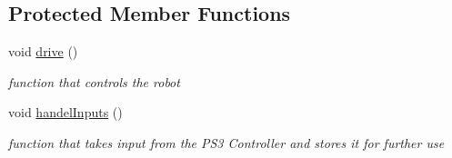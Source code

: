 \subsection*{Protected Member Functions}
\begin{DoxyCompactItemize}
\item 
\mbox{\label{class_new_omni_drive_a181b752b0907c43da6b6bccb5b6b1106}} 
void \mbox{\hyperlink{class_new_omni_drive_a181b752b0907c43da6b6bccb5b6b1106}{drive}} ()
\begin{DoxyCompactList}\small\item\em function that controls the robot \end{DoxyCompactList}\item 
\mbox{\label{class_new_omni_drive_ab3fd088274c17cb1fc7b2739e31a80a0}} 
void \mbox{\hyperlink{class_new_omni_drive_ab3fd088274c17cb1fc7b2739e31a80a0}{handel\+Inputs}} ()
\begin{DoxyCompactList}\small\item\em function that takes input from the P\+S3 Controller and stores it for further use \end{DoxyCompactList}\end{DoxyCompactItemize}
